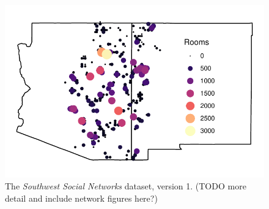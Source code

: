 \documentclass[10pt]{iopart}
\begin{document}
\begin{figure}[!htbp]
\centering
\includegraphics[width=.9\linewidth]{figures/site_distribution.pdf}
\caption{The \emph{Southwest Social Networks} dataset, version 1. (TODO more detail and include network figures here?)} 
\label{fig:network-plot}
\end{figure}
\end{document}
